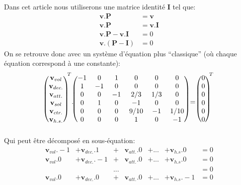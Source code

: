 \documentclass[letterpaper]{article}
\begin{document}
      Dans cet article nous utiliserons une matrice identité $\mathbf{I}$ tel que:
      \begin{align*}
       \mathbf{v} . \mathbf{P} &= \mathbf{v}\\
       \mathbf{v} . \mathbf{P} &= \mathbf{v} . \mathbf{I}\\
       \mathbf{v} . \mathbf{P} - \mathbf{v}. \mathbf{I} &= 0\\
       \mathbf{v} . (\mathbf{P} - \mathbf{I}) &= 0
      \end{align*}
      On se retrouve donc avec un système d'équation plus ``classique'' (où chaque 
      équation correspond à une constante):
      $$\begin{blockarray}{(c)}
	  \mathbf{v}_{vol}\\
	  \mathbf{v}_{dec.}\\
	  \mathbf{v}_{att.}\\
	  \mathbf{v}_{sol}\\
	  \mathbf{v}_{ctr.}\\
	  \mathbf{v}_{h.s.}
	\end{blockarray}^T .
	\begin{blockarray}{(cccccc)}
	    -1 & 0  & 1  & 0    & 0   & 0    \\
	    1  & -1 & 0  & 0    & 0   & 0    \\
	    0  & 0  & -1 & 2/3  & 1/3 & 0    \\
	    0  & 1  & 0  & -1   & 0   & 0    \\
	    0  & 0  & 0  & 9/10 & -1  & 1/10 \\
	    0  & 0  & 0  & 1    & 0   & -1    \\
	\end{blockarray}
	= 
	\begin{blockarray}{(c)}
	  0\\
	  0\\
	  0\\
	  0\\
	  0\\
	  0
	\end{blockarray}^T$$
      Qui peut être décomposé en sous-équation:
      \begin{align*}
       \mathbf{v}_{vol} . -1 &+ \mathbf{v}_{dec.} . 1 &+ &\mathbf{v}_{att.} . 0 &+ ... &+ \mathbf{v}_{h.s} . 0 &= 0\\
       \mathbf{v}_{vol} . 0 &+ \mathbf{v}_{dec.} . -1 &+ &\mathbf{v}_{att.} . 0 &+ ... &+ \mathbf{v}_{h.s} . 0 &= 0\\
       & & ... & & & &= 0\\
       \mathbf{v}_{vol} . 0 &+ \mathbf{v}_{dec.} . 0 &+ &\mathbf{v}_{att.} . 0 &+ ... &+ \mathbf{v}_{h.s} . -1 &= 0\\
      \end{align*}
\end{document}
